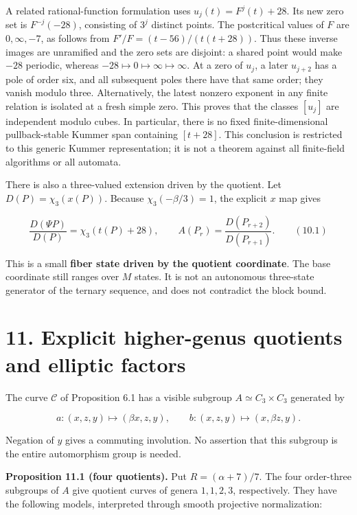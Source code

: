 \documentclass[
  11pt,
  a4paper,
]{article}
\begin{document}
A related rational-function formulation uses \(u_j(t)=F^j(t)+28\). Its
new zero set is \(F^{-j}(-28)\), consisting of \(3^j\) distinct points.
The postcritical values of \(F\) are \(0,\infty,-7\), as follows from
\(F'/F=(t-56)/(t(t+28))\). Thus these inverse images are unramified and
the zero sets are disjoint: a shared point would make \(-28\) periodic,
whereas \(-28\mapsto0\mapsto\infty\mapsto\infty\). At a zero of \(u_j\),
a later \(u_{j+2}\) has a pole of order six, and all subsequent poles
there have that same order; they vanish modulo three. Alternatively, the
latest nonzero exponent in any finite relation is isolated at a fresh
simple zero. This proves that the classes \([u_j]\) are independent
modulo cubes. In particular, there is no fixed finite-dimensional
pullback-stable Kummer span containing \([t+28]\). This conclusion is
restricted to this generic Kummer representation; it is not a theorem
against all finite-field algorithms or all automata.

There is also a three-valued extension driven by the quotient. Let
\(D(P)=\chi_3(x(P))\). Because \(\chi_3(-\beta/3)=1\), the explicit
\(x\) map gives

\[
\frac{D(\Psi P)}{D(P)}=\chi_3(t(P)+28),\qquad
A(P_r)=\frac{D(P_{r+2})}{D(P_{r+1})}. \qquad (10.1)
\]

This is a small \textbf{fiber state driven by the quotient coordinate}.
The base coordinate still ranges over \(M\) states. It is not an
autonomous three-state generator of the ternary sequence, and does not
contradict the block bound.

\section{11. Explicit higher-genus quotients and elliptic
factors}\label{explicit-higher-genus-quotients-and-elliptic-factors}

The curve \(\mathcal C\) of Proposition 6.1 has a visible subgroup
\(A\simeq C_3\times C_3\) generated by

\[
a:(x,z,y)\mapsto(\beta x,z,y),\qquad
b:(x,z,y)\mapsto(x,\beta z,y).
\]

Negation of \(y\) gives a commuting involution. No assertion that this
subgroup is the entire automorphism group is needed.

\textbf{Proposition 11.1 (four quotients).} Put \(R=(\alpha+7)/7\). The
four order-three subgroups of \(A\) give quotient curves of genera
\(1,1,2,3\), respectively. They have the following models, interpreted
through smooth projective normalization:
\end{document}
